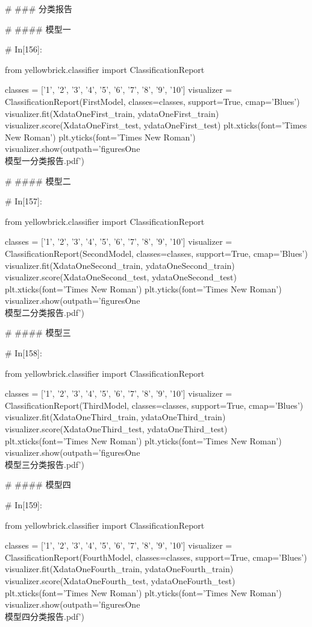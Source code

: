 \documentclass{MathorCupmodeling}
\begin{document}
\begin{python}
	# ### 分类报告
	
	# #### 模型一
	
	# In[156]:
	
	
	from yellowbrick.classifier import ClassificationReport
	
	classes = ['1', '2', '3', '4', '5', '6', '7', '8', '9', '10']
	visualizer = ClassificationReport(FirstModel, classes=classes, support=True, cmap='Blues')
	visualizer.fit(XdataOneFirst_train, ydataOneFirst_train)
	visualizer.score(XdataOneFirst_test, ydataOneFirst_test)
	plt.xticks(font='Times New Roman')
	plt.yticks(font='Times New Roman')
	visualizer.show(outpath='figuresOne\\[附件1]模型一分类报告.pdf')
	
	# #### 模型二
	
	# In[157]:
	
	
	from yellowbrick.classifier import ClassificationReport
	
	classes = ['1', '2', '3', '4', '5', '6', '7', '8', '9', '10']
	visualizer = ClassificationReport(SecondModel, classes=classes, support=True, cmap='Blues')
	visualizer.fit(XdataOneSecond_train, ydataOneSecond_train)
	visualizer.score(XdataOneSecond_test, ydataOneSecond_test)
	plt.xticks(font='Times New Roman')
	plt.yticks(font='Times New Roman')
	visualizer.show(outpath='figuresOne\\[附件1]模型二分类报告.pdf')
	
	# #### 模型三
	
	# In[158]:
	
	
	from yellowbrick.classifier import ClassificationReport
	
	classes = ['1', '2', '3', '4', '5', '6', '7', '8', '9', '10']
	visualizer = ClassificationReport(ThirdModel, classes=classes, support=True, cmap='Blues')
	visualizer.fit(XdataOneThird_train, ydataOneThird_train)
	visualizer.score(XdataOneThird_test, ydataOneThird_test)
	plt.xticks(font='Times New Roman')
	plt.yticks(font='Times New Roman')
	visualizer.show(outpath='figuresOne\\[附件1]模型三分类报告.pdf')
	
	# #### 模型四
	
	# In[159]:
	
	
	from yellowbrick.classifier import ClassificationReport
	
	classes = ['1', '2', '3', '4', '5', '6', '7', '8', '9', '10']
	visualizer = ClassificationReport(FourthModel, classes=classes, support=True, cmap='Blues')
	visualizer.fit(XdataOneFourth_train, ydataOneFourth_train)
	visualizer.score(XdataOneFourth_test, ydataOneFourth_test)
	plt.xticks(font='Times New Roman')
	plt.yticks(font='Times New Roman')
	visualizer.show(outpath='figuresOne\\[附件1]模型四分类报告.pdf')
	

\end{python}
\end{document}
